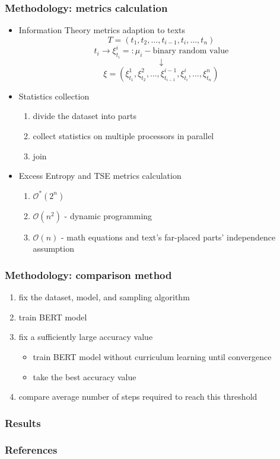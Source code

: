 \documentclass{beamer}
\begin{document}
\begin{frame}
	\frametitle{Methodology: metrics calculation}
	\begin{itemize}
		\item Information Theory metrics adaption to texts
			\[
			T=(t_1, t_2, \ldots, t_{i-1},t_i,\ldots, t_n)
			\]
			\[
			t_i\rightarrow \xi^i_{t_i} =: \mu_i - \text{binary random value}
			\]
			\[
			\downarrow
			\]
			\[
			\xi=(\xi^1_{t_1},\xi^2_{t_2},\ldots,\xi^{i-1}_{t_{i-1}},\xi^i_{t_i},\ldots,\xi^n_{t_n})
			\]
		\item Statistics collection
			\begin{enumerate}
				\item divide the dataset into parts
				\item collect statistics on multiple processors in parallel
				\item join
			\end{enumerate}
		\item Excess Entropy and TSE metrics calculation
			\begin{enumerate}
				\item $\mathcal{O^*}(2^n)$
				\item $\mathcal{O}(n^2)$ - dynamic programming
				\item $\mathcal{O}(n)$ - math equations and text’s far-placed parts’ independence assumption
			\end{enumerate}
	\end{itemize}
\end{frame}

\begin{frame}
	\frametitle{Methodology: comparison method}
	\begin{enumerate}
		\item fix the dataset, model, and sampling algorithm
		\item train BERT model
		\item fix a sufficiently large accuracy value
			\begin{itemize}
				\item train BERT model without curriculum learning until convergence
				\item take the best accuracy value
			\end{itemize}
		\item compare average number of steps required to reach this threshold
	\end{enumerate}
\end{frame}

\begin{frame}
	\frametitle{Results}
	
\end{frame}

\begin{frame}
	\frametitle{References}
	
\end{frame}
\end{document}
